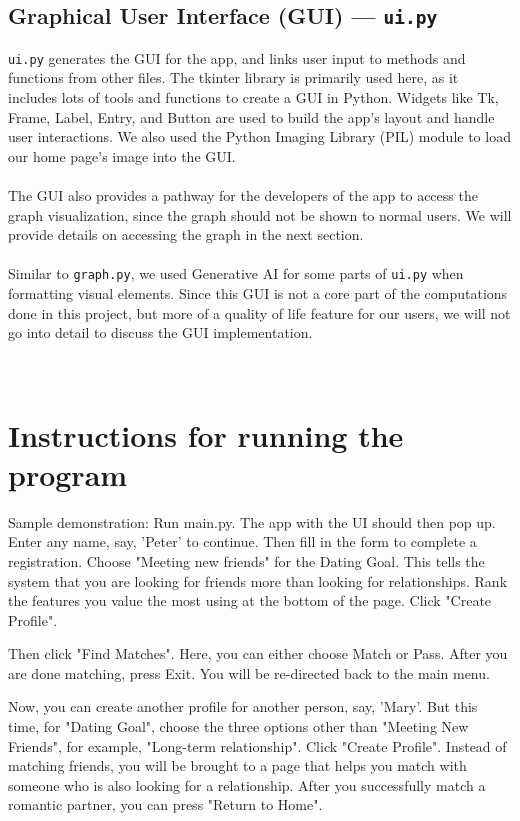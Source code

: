 \documentclass[fontsize=11pt]{article}
\begin{document}
\subsection*{Graphical User Interface (GUI) --- \texttt{ui.py}}
\texttt{ui.py} generates the GUI for the app, and links user input to methods and functions from other files.
The tkinter library is primarily used here, as it includes lots of tools and functions to create a GUI in Python.
Widgets like Tk, Frame, Label, Entry, and Button are used to build the app’s layout and handle user interactions.
We also used the Python Imaging Library (PIL) module to load our home page’s image into the GUI.
\\
\\
The GUI also provides a pathway for the developers of the app to access the graph visualization, since the graph should not be shown to normal users.
We will provide details on accessing the graph in the next section.
\\
\\
Similar to \texttt{graph.py}, we used Generative AI for some parts of \texttt{ui.py} when formatting visual elements.
Since this GUI is not a core part of the computations done in this project, but more of a quality of life feature for our users, we will not go into detail to discuss the GUI implementation.

\\
\section{Instructions for running the program}
Sample demonstration: Run main.py. The app with the UI should then pop up. Enter any name, say, 'Peter' to continue. Then fill in the form to complete a registration. Choose "Meeting new friends" for the Dating Goal. This tells the system that you are looking for friends more than looking for relationships. Rank the features you value the most using at the bottom of the page. Click "Create Profile".

Then click "Find Matches". Here, you can either choose Match or Pass. After you are done matching, press Exit. You will be re-directed back to the main menu.

Now, you can create another profile for another person, say, 'Mary'. But this time, for "Dating Goal", choose the three options other than "Meeting New Friends", for example, "Long-term relationship". Click "Create Profile". Instead of matching friends, you will be brought to a page that helps you match with someone who is also looking for a relationship. After you successfully match a romantic partner, you can press "Return to Home".
\end{document}
